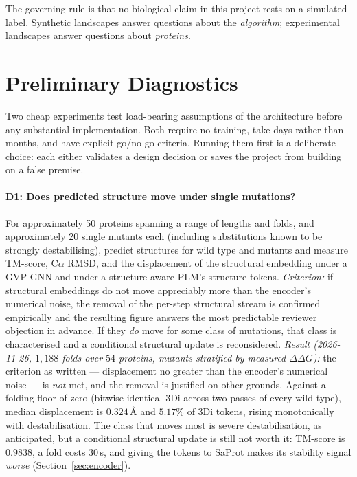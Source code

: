 \documentclass[12pt, a4paper]{article}
\begin{document}
\noindent The governing rule is that no biological claim in this project rests on a simulated label. Synthetic landscapes answer questions about the \textit{algorithm}; experimental landscapes answer questions about \textit{proteins}.

\section{Preliminary Diagnostics}
\label{sec:diagnostics}

Two cheap experiments test load-bearing assumptions of the architecture before any substantial implementation. Both require no training, take days rather than months, and have explicit go/no-go criteria. Running them first is a deliberate choice: each either validates a design decision or saves the project from building on a false premise.

\paragraph{D1: Does predicted structure move under single mutations?} For approximately 50 proteins spanning a range of lengths and folds, and approximately 20 single mutants each (including substitutions known to be strongly destabilising), predict structures for wild type and mutants and measure TM-score, C$\alpha$ RMSD, and the displacement of the structural embedding under a GVP-GNN and under a structure-aware PLM's structure tokens. \textit{Criterion:} if structural embeddings do not move appreciably more than the encoder's numerical noise, the removal of the per-step structural stream is confirmed empirically and the resulting figure answers the most predictable reviewer objection in advance. If they \textit{do} move for some class of mutations, that class is characterised and a conditional structural update is reconsidered. \textit{Result (2026-11-26, $1{,}188$ folds over $54$ proteins, mutants stratified by measured $\Delta\Delta G$):} the criterion as written --- displacement no greater than the encoder's numerical noise --- is \textit{not} met, and the removal is justified on other grounds. Against a folding floor of zero (bitwise identical $3$Di across two passes of every wild type), median displacement is $0.324$\,\AA{} and $5.17\%$ of $3$Di tokens, rising monotonically with destabilisation. The class that moves most is severe destabilisation, as anticipated, but a conditional structural update is still not worth it: TM-score is $0.9838$, a fold costs $30$\,s, and giving the tokens to SaProt makes its stability signal \textit{worse} (Section~\ref{sec:encoder}).
\end{document}
